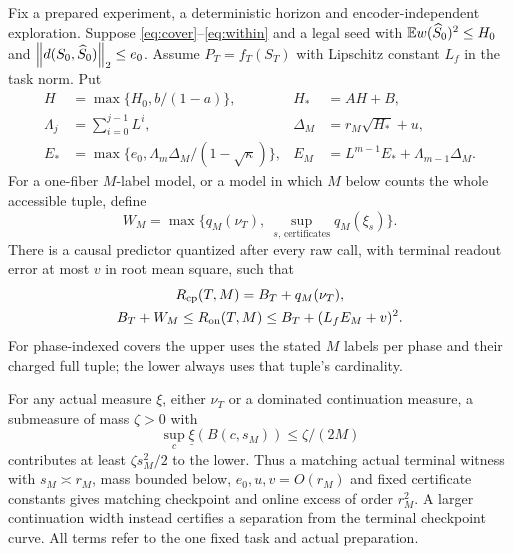 \begin{theorem}\label{thm:transfer}
Fix a prepared experiment, a deterministic horizon and encoder-independent exploration. Suppose \eqref{eq:cover}--\eqref{eq:within} and a legal seed with $\mathbb E w(\widehat S_0)^2\le H_0$ and $\left\lVert d(S_0,\widehat S_0)\right\rVert_2\le e_0$. Assume $P_T=f_T(S_T)$ with Lipschitz constant $L_f$ in the task norm. Put
\begin{align*}
 H&=\max\{H_0,b/(1-a)\},& H_*&=AH+B,\\
 \Lambda_j&=\sum_{i=0}^{j-1}L^i,& \Delta_M&=r_M\sqrt{H_*}+u,\\
 E_*&=\max\{e_0,\Lambda_m\Delta_M/(1-\sqrt\kappa)\},&
 E_M&=L^{m-1}E_*+\Lambda_{m-1}\Delta_M.
\end{align*}
For a one-fiber $M$-label model, or a model in which $M$ below counts the whole accessible tuple, define
\[
 W_M=\max\{q_M(\nu_T),\ \sup_{s,\,\text{certificates}}q_M(\xi_s)\}.
\]
There is a causal predictor quantized after every raw call, with terminal readout error at most $v$ in root mean square, such that
\begin{equation}\label{eq:central}
 \begin{gathered}
 R_{\mathrm{cp}}(T,M)=B_T+q_M(\nu_T),\\
 B_T+W_M\le R_{\mathrm{on}}(T,M)
       \le B_T+(L_fE_M+v)^2.
 \end{gathered}
\end{equation}
For phase-indexed covers the upper uses the stated $M$ labels per phase and their charged full tuple; the lower always uses that tuple's cardinality.

For any actual measure $\xi$, either $\nu_T$ or a dominated continuation measure, a submeasure of mass $\zeta>0$ with
\begin{equation}\label{eq:smallball}
 \sup_c\underline\xi(B(c,s_M))\le\zeta/(2M)
\end{equation}
contributes at least $\zeta s_M^2/2$ to the lower. Thus a matching actual terminal witness with $s_M\asymp r_M$, mass bounded below, $e_0,u,v=O(r_M)$ and fixed certificate constants gives matching checkpoint and online excess of order $r_M^2$. A larger continuation width instead certifies a separation from the terminal checkpoint curve. All terms refer to the one fixed task and actual preparation.
\end{theorem}
